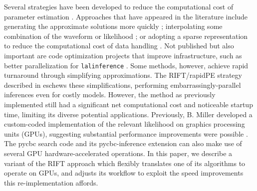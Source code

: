 \documentclass[twocolumn,prd,nofootinbib]{revtex4}
\newcommand\AddedResponse[1]{{\color{blue} {#1}}}
\begin{document}
Several strategies have been
developed to reduce the 
computational cost of parameter estimation \cite{gwastro-pe-Brandon-STF2,gwastro-PE-AlternativeArchitectures,gw-astro-ReducedOrderQuadraturePE-TiglioEtAl2014,2016PhRvD..94d4031S,2017CQGra..34k5006V,2018arXiv180608792Z}.  
Approaches that have appeared in the literature include
generating the approximate solutions more quickly \cite{gwastro-mergers-PE-ReducedOrder-2013,2014PhRvX...4c1006F,2013PhRvD..87l2002S,2013PhRvD..87d4008C,gwastro-mergers-IMRPhenomP,gwastro-SpinTaylorF2-2013}; 
interpolating some combination
of the waveform or likelihood \cite{gwastro-approx-ROMNR-Blackman2015,2013PhRvD..87d4008C,2013PhRvD..87l2002S,2014CQGra..31s5010P,2014PhRvD..90d4074S,gwastro-PE-AlternativeArchitectures,cole2014likelihood,2012MNRAS.421..169G};  or 
adopting a sparse representation to reduce the computational cost of data
handling \cite{antil2013two,gwastro-mergers-PE-ReducedOrder-2013,2016PhRvD..94d4031S,gw-astro-ReducedOrderQuadraturePE-TiglioEtAl2014,gwastro-PE-AlternativeArchitectures,2010arXiv1007.4820C,2018arXiv180608792Z}.   %
\AddedResponse{Not published but also important are code optimization projects that improve    infrastructure,
  such as better parallelization for \texttt{lalinference} \cite{gw-astro-PE-lalinference-v1,lalsuite}.}
 Some methods, however, achieve rapid turnaround through simplifying approximations.  
%
The RIFT/rapidPE strategy described in \cite{gwastro-PE-AlternativeArchitectures,2017CQGra..34n4002O,gwastro-PENR-RIFT,NRPaper} eschews these simplifications, performing
embarrassingly-parallel inferences even for costly models.   However, the method as previously implemented still had a
significant net  computational cost and noticeable startup time, limiting its diverse potential applications.
%
Previously, B. Miller  developed a custom-coded  implementation of the
relevant likelihood on graphics processing units (GPUs), suggesting substantial performance improvements were possible
\cite{Thesis-Brandon-2016,GPU-NU-work}.  
\AddedResponse{The pycbc search code\cite{2016CQGra..33u5004U} and its pycbc-inference extension
  \cite{2019PASP..131b4503B} can also make use of several GPU
  hardware-accelerated operations.
}
In this paper,  we describe a variant of the RIFT approach which flexibly translates one of its
algorithms to operate on GPUs, and adjusts its workflow to exploit the speed improvements
this re-implementation affords.
\end{document}
